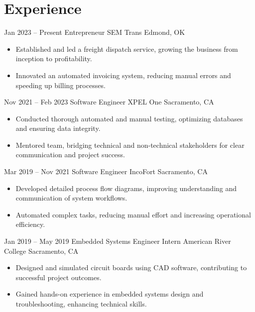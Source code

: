 \section{Experience}

\cventry
    {Jan 2023 -- Present}
    {Entrepreneur}
    {SEM Trans}
    {Edmond, OK}
    {}
    {%
        \begin{itemize}
            \item[\textbullet] Established and led a freight dispatch service,
            growing the business from inception to profitability.
            \item[\textbullet] Innovated an automated invoicing system, reducing
            manual errors and speeding up billing processes.
        \end{itemize}
    }

\cventry
    {Nov 2021 -- Feb 2023}
    {Software Engineer}
    {XPEL One}
    {Sacramento, CA}
    {}
    {%
        \begin{itemize}
            \item[\textbullet] Conducted thorough automated and manual testing,
            optimizing databases and ensuring data integrity.
            \item[\textbullet] Mentored team, bridging technical and
            non-technical stakeholders for clear communication and project
            success.
        \end{itemize}
    }

\cventry
    {Mar 2019 -- Nov 2021}
    {Software Engineer}
    {IncoFort}
    {Sacramento, CA}
    {}
    {%
        \begin{itemize}
            \item[\textbullet] Developed detailed process flow diagrams,
            improving understanding and communication of system workflows.
            \item[\textbullet] Automated complex tasks, reducing manual effort
            and increasing operational efficiency.
        \end{itemize}
    }

\cventry
    {Jan 2019 -- May 2019}
    {Embedded Systems Engineer Intern}
    {American River College}
    {Sacramento, CA}
    {}
    {%
        \begin{itemize}
            \item[\textbullet] Designed and simulated circuit boards using CAD
            software, contributing to successful project outcomes.
            \item[\textbullet] Gained hands-on experience in embedded systems
            design and troubleshooting, enhancing technical skills.
        \end{itemize}
    }
